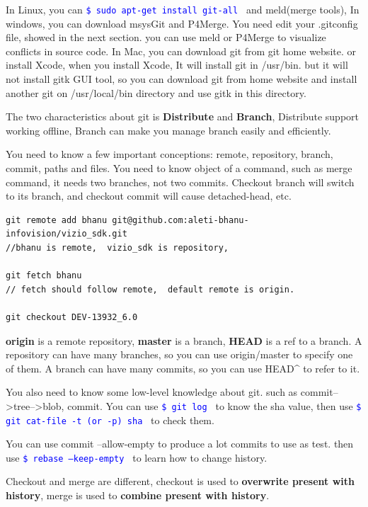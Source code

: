 \documentclass[paper=8.5in:11in, twoside, 12pt, pagesize=pdftex]{book}
\newcommand{\linuxcommand}[1]{\texttt{\textcolor{blue}{\$ #1 \Pisymbol{psy}{191}}}}
\begin{document}
	In Linux, you can \linuxcommand{sudo apt-get install git-all} and meld(merge tools), In windows, you can download msysGit and P4Merge. You need edit your .gitconfig file, showed in the next section. you can use meld or P4Merge to visualize conflicts in source code. In Mac, you can download git from git home website. or install Xcode, when you install Xcode, It will install git in /usr/bin. but it will not install gitk GUI tool, so you can download git from home website and install another git on /usr/local/bin directory and use gitk in this directory. 
	
	The two characteristics about git is \textbf{Distribute} and \textbf{Branch}, Distribute support working offline, Branch can make you manage branch easily and efficiently.
	
	You need to know a few important conceptions: remote, repository, branch, commit, paths and files. You need to know object of a command, such as merge command, it needs two branches, not two commits. Checkout branch will switch to its branch, and checkout commit will cause detached-head, etc.  
	
\begin{lstlisting}
git remote add bhanu git@github.com:aleti-bhanu-infovision/vizio_sdk.git
//bhanu is remote,  vizio_sdk is repository, 

git fetch bhanu
// fetch should follow remote,  default remote is origin.

git checkout DEV-13932_6.0	
\end{lstlisting}

	
	\textbf{origin} is a remote repository, \textbf{master} is a branch, \textbf{HEAD} is a ref to a branch. A repository can have many branches, so you can use origin/master to specify one of them. A branch can have many commits, so you can use HEAD\^{} to refer to it.
	
	You also need to know some low-level knowledge about git. such as commit-->tree-->blob,  commit. You can use \linuxcommand{git log} to know the sha value, then use \linuxcommand{git cat-file -t (or -p) sha} to check them. 
	
	You can use commit --allow-empty to produce a lot commits to use as test. then use \linuxcommand{rebase --keep-empty } to learn how to change history. 
	
	Checkout and merge are different, checkout is used to \textbf{overwrite present with history}, merge is used to \textbf{combine present with history}.  
	
\end{document}
